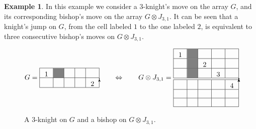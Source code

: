 \documentclass{amsart}
\theoremstyle{definition}
\newtheorem{ex}[prop]{Example}
\numberwithin{equation}{section}
\newcommand\tikzmark[2]{%
\tikz[remember picture,baseline] \node[inner sep=2pt,outer sep=0] (#1){#2};%
}
\newcommand\link[2]{%
\begin{tikzpicture}[remember picture, overlay, >=stealth, shift={(0,0)}]
  \draw[->] (#1) to (#2);
\end{tikzpicture}%
}
\newcommand{\WidestEntry}{$\bullet$}%
\newcommand{\SetToWidest}[1]{\makebox[\widthof{\WidestEntry}]{$#1$}}%
\begin{document}
\begin{ex}
In this example we consider a $3$-knight's move on the array $G$, and its corresponding bishop's move on the array $G \otimes J_{3,1}$. It can be seen that a knight's jump on $G$, from the cell labeled $1$ to the one labeled $2$, is equivalent to three consecutive bishop's moves on $G \otimes J_{3,1}$. 
    \begin{figure}[h]\label{fig:correspondence} 
$$
G = \begin{array}{|c|c|c|c|c|} \hline
\tikzmark{a}{1}&\cellcolor{gray}&&& \tikzmark{b}{} \\ \hline 
\SetToWidest{}&\SetToWidest{} &\SetToWidest{}&\SetToWidest{}&\tikzmark{c}{2} \\ \hline
\end{array}
\link{a}{b}
\link{b}{c} \qquad
\Leftrightarrow \qquad
G \otimes J_{3,1} = \begin{array}{|c|c|c|c|c|} \hline
\tikzmark{a1}{1}&\cellcolor{gray}&\tikzmark{b1}{}&&  \\ \hline
&\cellcolor{gray}&\tikzmark{c1}{2}&\tikzmark{d1}{}&  \\ \hline
&\cellcolor{gray}&&\tikzmark{e1}{3}& \tikzmark{f1}{} \\ \hline \hline
&&&&\tikzmark{g1}{4}\\ \hline 
&&&&\\ \hline
\SetToWidest{}&\SetToWidest{}&\SetToWidest{}&\SetToWidest{}&\SetToWidest{}\\ \hline
\end{array}
\link{a1}{b1}
\link{b1}{c1}
\link{c1}{d1} 
\link{d1}{e1} 
\link{e1}{f1} 
\link{f1}{g1} 
$$
\caption{A $3$-knight on $G$ and a bishop on $G\otimes J_{3,1}$.}
\end{figure}
\end{ex}
\end{document}
